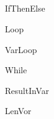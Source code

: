 \subsection{}

\begin{procdesc}{IfThenElse}{}
\end{procdesc}

\begin{procdesc}{Loop}{}
\end{procdesc}

\begin{procdesc}{VarLoop}{}
\end{procdesc}

\begin{procdesc}{While}{}
\end{procdesc}

\begin{procdesc}{ResultInVar}{}
\end{procdesc}

\begin{procdesc}{LenVor}{}
\end{procdesc}
